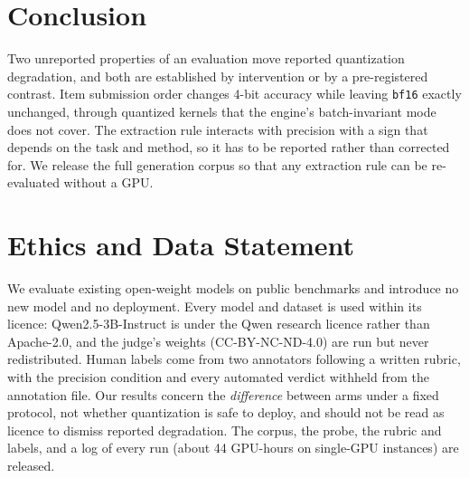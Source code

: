 \documentclass[conference]{IEEEtran}
\begin{document}
\section{Conclusion}
\label{sec:conclusion}

Two unreported properties of an evaluation move reported quantization degradation, and both
are established by intervention or by a pre-registered contrast. Item submission order changes
4-bit accuracy while leaving \texttt{bf16} exactly unchanged, through quantized kernels that the
engine's batch-invariant mode does not cover. The extraction rule interacts with precision with
a sign that depends on the task and method, so it has to be reported rather than corrected
for. We release the full generation corpus so that any extraction rule can be re-evaluated
without a GPU.

\section*{Ethics and Data Statement}
We evaluate existing open-weight models on public benchmarks and introduce no new model and no
deployment. Every model and dataset is used within its licence: Qwen2.5-3B-Instruct is under the
Qwen research licence rather than Apache-2.0, and the judge's weights (CC-BY-NC-ND-4.0) are run
but never redistributed. Human labels come from two annotators following a written rubric, with
the precision condition and every automated verdict withheld from the annotation file. Our
results concern the \emph{difference} between arms under a fixed protocol, not whether
quantization is safe to deploy, and should not be read as licence to dismiss reported
degradation. The corpus, the probe, the rubric and labels, and a log of every run (about 44
GPU-hours on single-GPU instances) are released.



\end{document}
